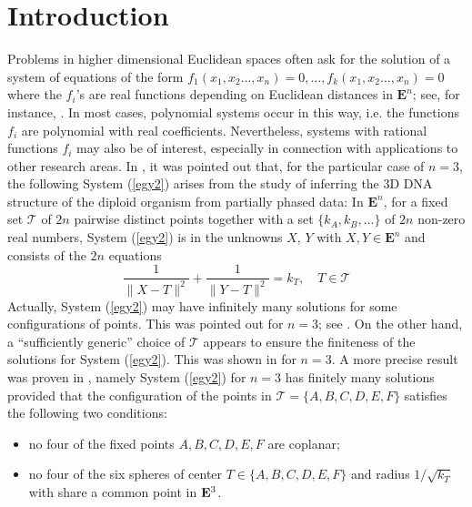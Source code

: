\documentclass[10pt]{amsart}
\theoremstyle{definition}
\theoremstyle{remark}
\begin{document}
\section{Introduction}
Problems in higher dimensional Euclidean spaces often ask for the solution of a system of equations of the form $f_1(x_1,x_2\ldots,x_n)=0, \ldots, f_k(x_1,x_2\ldots,x_n)=0$ where the $f_i$'s are real functions depending on Euclidean distances in ${\mathbf{E}}^n$; see, for instance, \cite{Lib}. In most cases, polynomial systems occur in this way, i.e. the functions $f_i$ are polynomial with real coefficients. Nevertheless, systems with rational functions $f_i$ may also be of interest, especially in connection with applications to other research areas. In \cite{cif},  it was pointed out that, for the particular case of $n=3$, the following System (\ref{egy2}) arises from the study of inferring the 3D DNA structure of the diploid organism from partially phased data: In ${\mathbf{E}}^{n}$, for a fixed set $\mathcal{T}$ of $2n$ pairwise distinct points together with  a set $\{k_A,k_B,\ldots\}$ of $2n$ non-zero real numbers, System (\ref{egy2}) is in the unknowns $X$, $Y$ with $X,Y\in {\mathbf{E}}^n$ and consists of the $2n$ equations 
\begin{equation}
\label{egy2}\frac{1}{\|X-T\|^2}  +\frac{1}{\|Y-T\|^2}=k_T, \quad T\in \mathcal{T}
\end{equation}
Actually, System (\ref{egy2}) may have infinitely many solutions for some configurations of points. This was pointed out for $n=3$; see \cite{ak2024}. On the other hand, a ``sufficiently generic'' choice of $\mathcal{T}$ appears to ensure the finiteness of the solutions for System (\ref{egy2}). This was shown in \cite{cif} for $n=3$. A more precise result was proven in \cite{ak2024}, namely System (\ref{egy2}) for $n=3$ has finitely many solutions provided that the configuration of the points in  $\mathcal{T}=\{A,B,C,D,E,F\}$  %
satisfies the following two conditions:
\begin{itemize}
\item[(I)] no four of the fixed points $A,B,C,D,E,F$ are coplanar;
\item[(II)] no four of the six spheres of center $T\in\{A,B,C,D,E,F\}$ and radius $1/\sqrt{k_T}$ with
share a common point in ${\bf{E}}^3$.
\end{itemize}
\end{document}
